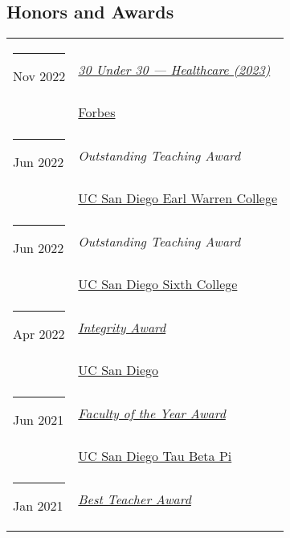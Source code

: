 \documentclass[margin,line]{res}
\begin{document}
\begin{resume}
\section{\sc Honors and Awards}
\begin{longtable}{@{}p{0.7in}p{4in}}
\hspace*{-4mm} \rule{-1mm}{5mm} Nov 2022 & \href{https://www.forbes.com/profile/niema-moshiri}{\textit{30 Under 30 --- Healthcare (2023)}}\\*
\hspace*{-4mm} \hspace*{-4mm} & \hspace{4mm} \href{https://www.forbes.com/30-under-30/2023/healthcare/}{Forbes}\\
\hspace*{-4mm} \rule{-1mm}{5mm} Jun 2022 & \textit{Outstanding Teaching Award}\\*
\hspace*{-4mm} \hspace*{-4mm} & \hspace{4mm} \href{https://warren.ucsd.edu/}{UC San Diego Earl Warren College}\\
\hspace*{-4mm} \rule{-1mm}{5mm} Jun 2022 & \textit{Outstanding Teaching Award}\\*
\hspace*{-4mm} \hspace*{-4mm} & \hspace{4mm} \href{https://sixth.ucsd.edu/}{UC San Diego Sixth College}\\
\hspace*{-4mm} \rule{-1mm}{5mm} Apr 2022 & \href{https://academicintegrity.ucsd.edu/events/integrity-awards/index.html}{\textit{Integrity Award}}\\*
\hspace*{-4mm} \hspace*{-4mm} & \hspace{4mm} \href{https://www.ucsd.edu/}{UC San Diego}\\
\hspace*{-4mm} \rule{-1mm}{5mm} Jun 2021 & \href{https://tbp.ucsd.edu/home}{\textit{Faculty of the Year Award}}\\*
\hspace*{-4mm} \hspace*{-4mm} & \hspace{4mm} \href{https://tbp.ucsd.edu/home}{UC San Diego Tau Beta Pi}\\
\hspace*{-4mm} \rule{-1mm}{5mm} Jan 2021 & \href{https://jacobsschool.ucsd.edu/faculty/best-teacher-awards}{\textit{Best Teacher Award}}\\*

\end{longtable}
\end{resume}
\end{document}
